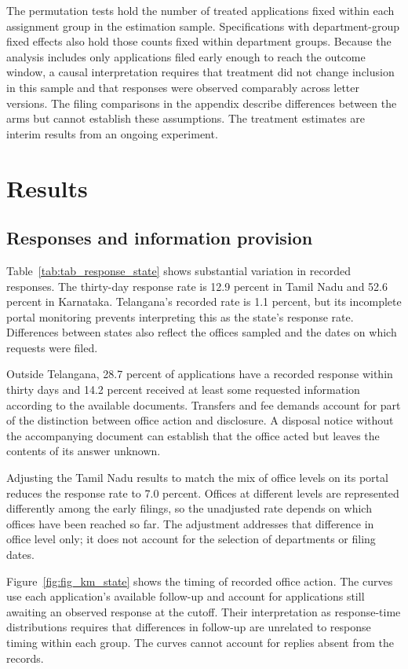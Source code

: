 \documentclass[11pt]{article}
\begin{document}
The permutation tests hold the number of treated applications fixed within each assignment group in the estimation sample. Specifications with department-group fixed effects also hold those counts fixed within department groups. Because the analysis includes only applications filed early enough to reach the outcome window, a causal interpretation requires that treatment did not change inclusion in this sample and that responses were observed comparably across letter versions. The filing comparisons in the appendix describe differences between the arms but cannot establish these assumptions. The treatment estimates are interim results from an ongoing experiment.

\section{Results}
\subsection{Responses and information provision}
Table~\ref{tab:tab_response_state} shows substantial variation in recorded responses. The thirty-day response rate is 12.9 percent in Tamil Nadu and 52.6 percent in Karnataka. Telangana's recorded rate is 1.1 percent, but its incomplete portal monitoring prevents interpreting this as the state's response rate. Differences between states also reflect the offices sampled and the dates on which requests were filed.

Outside Telangana, 28.7 percent of applications have a recorded response within thirty days and 14.2 percent received at least some requested information according to the available documents. Transfers and fee demands account for part of the distinction between office action and disclosure. A disposal notice without the accompanying document can establish that the office acted but leaves the contents of its answer unknown.

\FloatBarrier

Adjusting the Tamil Nadu results to match the mix of office levels on its portal reduces the response rate to 7.0 percent. Offices at different levels are represented differently among the early filings, so the unadjusted rate depends on which offices have been reached so far. The adjustment addresses that difference in office level only; it does not account for the selection of departments or filing dates.

Figure~\ref{fig:fig_km_state} shows the timing of recorded office action. The curves use each application's available follow-up and account for applications still awaiting an observed response at the cutoff. Their interpretation as response-time distributions requires that differences in follow-up are unrelated to response timing within each group. The curves cannot account for replies absent from the records.

\FloatBarrier
\end{document}

